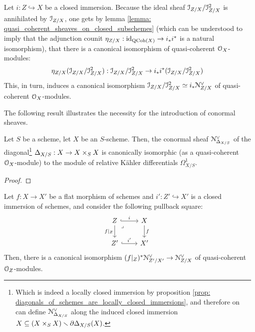         \begin{remark}
            Let $i: Z \hookrightarrow X$ be a closed immersion. Because the ideal sheaf $\mathcal{I}_{Z/X}/\mathcal{I}_{Z/X}^2$ is annihilated by $\mathcal{I}_{Z/X}$, one gets by lemma \ref{lemma: quasi_coherent_sheaves_on_closed_subschemes} (which can be understood to imply that the adjunction counit $\eta_{Z/X}: \mathrm{id}_{\mathrm{QCoh}(X)} \to i_*i^*$ is a natural isomorphism), that there is a canonical isomorphism of quasi-coherent $\mathcal{O}_X$-modules:
                $$\eta_{Z/X}(\mathcal{I}_{Z/X}/\mathcal{I}_{Z/X}^2): \mathcal{I}_{Z/X}/\mathcal{I}_{Z/X}^2 \to i_*i^*(\mathcal{I}_{Z/X}/\mathcal{I}_{Z/X}^2)$$
            This, in turn, induces a canonical isomorphism $\mathcal{I}_{Z/X}/\mathcal{I}_{Z/X}^2 \simeq i_*\mathcal{N}_{Z/X}^{\vee}$ of quasi-coherent $\mathcal{O}_X$-modules.
        \end{remark}
        The following result illustrates the necessity for the introduction of conormal sheaves. 
        \begin{proposition} \label{prop: conormal_sheaves_of_diagonals}
            \cite[\href{https://stacks.math.columbia.edu/tag/08S2}{Tag 08S2}]{stacks-project} Let $S$ be a scheme, let $X$ be an $S$-scheme. Then, the conormal sheaf $\mathcal{N}_{\Delta_{X/S}}^{\vee}$ of the diagonal\footnote{Which is indeed a locally closed immersion by proposition \ref{prop: diagonals_of_schemes_are_locally_closed_immersions}, and therefore on can define $\mathcal{N}_{\Delta_{X/S}}^{\vee}$ along the induced closed immersion $X \subseteq (X \x_S X) \setminus \del \Delta_{X/S}(X)$.} $\Delta_{X/S}: X \to X \x_S X$ is canonically isomorphic (as a quasi-coherent $\mathcal{O}_X$-module) to the module of relative K\"ahler differentials $\Omega^1_{X/S}$.
        \end{proposition}
            \begin{proof}
                
            \end{proof}
        \begin{proposition} \label{prop: flat_base_changes_of_conormal_sheaves}
            Let $f: X \to X'$ be a flat morphism of schemes and $i': Z' \hookrightarrow X'$ is a closed immersion of schemes, and consider the following pullback square:
                $$
                    \begin{tikzcd}
                        Z & X \\
                        {Z'} & {X'}
                        \arrow["{f|_Z}"', from=1-1, to=2-1]
                        \arrow["{i'}", hook, from=2-1, to=2-2]
                        \arrow["f", from=1-2, to=2-2]
                        \arrow["i", hook, from=1-1, to=1-2]
                        \arrow["\lrcorner"{anchor=center, pos=0.125}, draw=none, from=1-1, to=2-2]
                    \end{tikzcd}
                $$
            Then, there is a canonical isomorphism $(f|_Z)^* \mathcal{N}_{Z'/X'}^{\vee} \to \mathcal{N}_{Z/X}^{\vee}$ of quasi-coherent $\mathcal{O}_Z$-modules. 
        \end{proposition}
